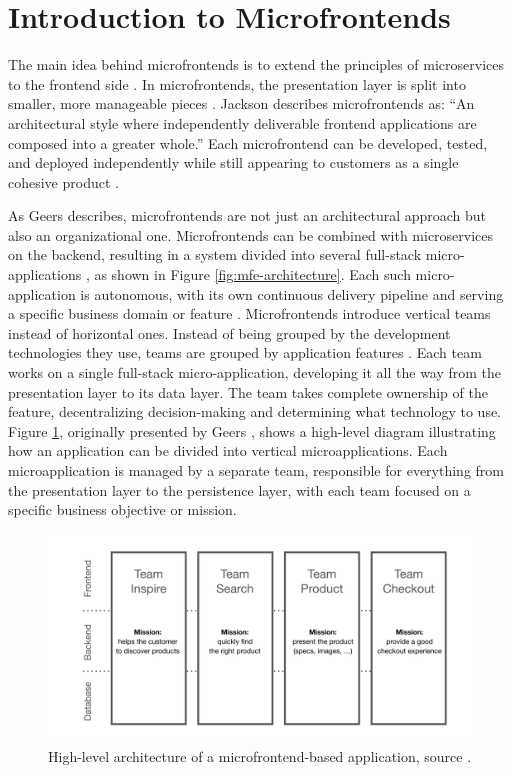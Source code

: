 \section{Introduction to Microfrontends}  
The main idea behind microfrontends is to extend the principles of microservices to the frontend side \cite{Montelius, Geers}. In microfrontends, the presentation layer is split into smaller, more manageable pieces \cite{Montelius}. Jackson \cite{Jackson} describes microfrontends as: ``An architectural style where independently deliverable frontend applications are composed into a greater whole.'' Each microfrontend can be developed, tested, and deployed independently while still appearing to customers as a single cohesive product \cite{Jackson}.

As Geers \cite{Geers} describes, microfrontends are not just an architectural approach but also an organizational one. Microfrontends can be combined with microservices on the backend, resulting in a system divided into several full-stack micro-applications \cite{Montelius}, as shown in Figure \ref{fig:mfe-architecture}. Each such micro-application is autonomous, with its own continuous delivery pipeline and serving a specific business domain or feature \cite{Peltonen}. Microfrontends introduce vertical teams instead of horizontal ones. Instead of being grouped by the development technologies they use, teams are grouped by application features \cite{Montelius}. Each team works on a single full-stack micro-application, developing it all the way from the presentation layer to its data layer. The team takes complete ownership of the feature, decentralizing decision-making and determining what technology to use. Figure \ref{fig:microfrontends-architecture}, originally presented by Geers \cite{GeersWeb}, shows a high-level diagram illustrating how an application can be divided into vertical microapplications. Each microapplication is managed by a separate team, responsible for everything from the presentation layer to the persistence layer, with each team focused on a specific business objective or mission.
\begin{figure}[h]  
  \centerline{\includegraphics[width=1\textwidth]{images/microfrontends-architecture.png}}  
  \caption[Microfrontend Architecture]{High-level architecture of a microfrontend-based application, source \cite{GeersWeb}.}  
  \label{fig:microfrontends-architecture}  
\end{figure}